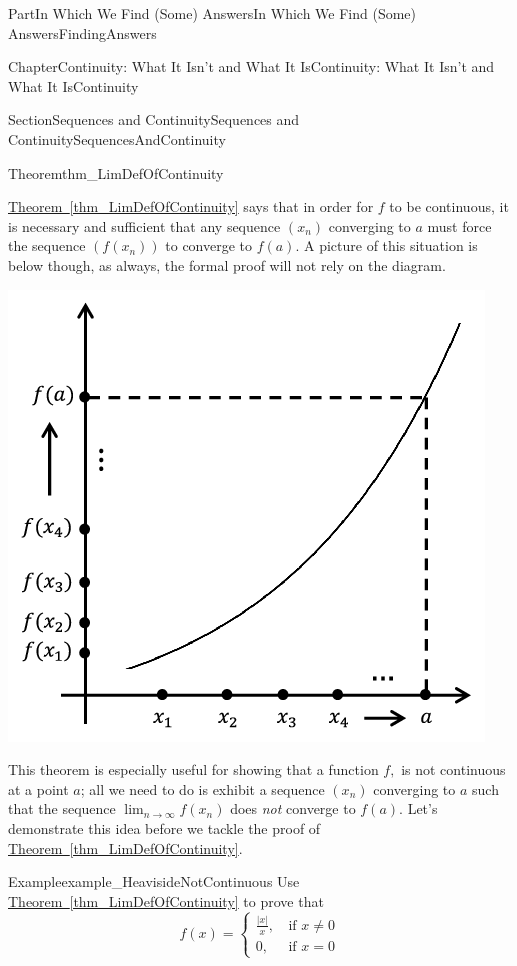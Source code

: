 \documentclass[oneside,10pt,]{book}
\newcommand{\xreffont}{\relax}
\numberwithin{equation}{part}
\newcommand{\amp}{&}
\begin{document}
\begin{partptx}{Part}{In Which We Find (Some) Answers}{}{In Which We Find (Some) Answers}{}{}{FindingAnswers}
\begin{chapterptx}{Chapter}{Continuity: What It Isn't and What It Is}{}{Continuity: What It Isn't and What It Is}{}{}{Continuity}
\begin{sectionptx}{Section}{Sequences and Continuity}{}{Sequences and Continuity}{}{}{SequencesAndContinuity}
\begin{theorem}{Theorem}{}{}{thm_LimDefOfContinuity}
%
\end{theorem}
\hyperref[thm_LimDefOfContinuity]{Theorem~{\xreffont\ref{thm_LimDefOfContinuity}}} says that in order for \(f\) to be continuous, it is necessary and sufficient that any sequence \(\left(x_n\right)\) converging to \(a\) must force the sequence \(\left(f(x_n)\right)\) to converge to \(f(a)\).  A picture of this situation is below though, as always, the formal proof will not rely on the diagram.%
\begin{image}{0.315}{0.37}{0.315}{}%
\includegraphics[width=\linewidth]{external/images/Ch5fig6.png}
\end{image}%
This theorem is especially useful for showing that a function \(f,\) is not continuous at a point \(a\); all we need to do is exhibit a sequence \(\left(x_n\right)\) converging to \(a\) such that the sequence \(\lim_{n\rightarrow\infty}f(x_n)\) does \emph{not} converge to \(f(a)\).  Let's demonstrate this idea before we tackle the proof of \hyperref[thm_LimDefOfContinuity]{Theorem~{\xreffont\ref{thm_LimDefOfContinuity}}}.%
\begin{example}{Example}{}{example_HeavisideNotContinuous}%
Use \hyperref[thm_LimDefOfContinuity]{Theorem~{\xreffont\ref{thm_LimDefOfContinuity}}} to prove that%
\begin{equation*}
f(x)= \begin{cases}\frac{|x|}{x}\text{,} \amp \text{ if } x\neq 0\\ 0\text{,} \amp \text{ if } x=0 \end{cases}

\end{equation*}
\end{example}
\end{sectionptx}
\end{chapterptx}
\end{partptx}
\end{document}
